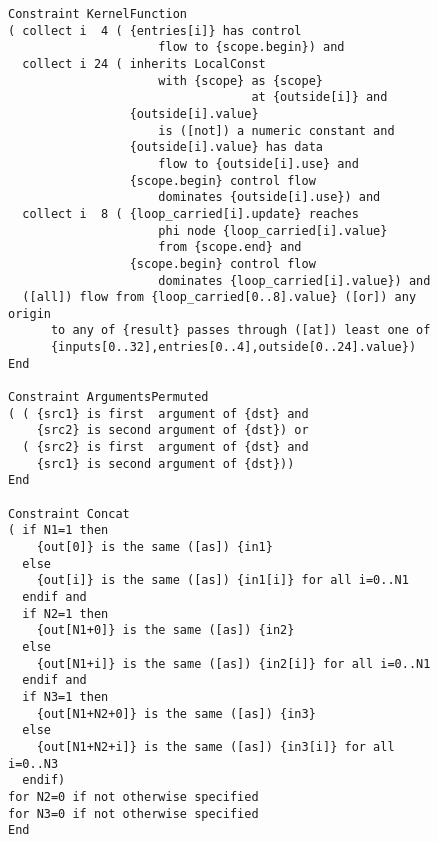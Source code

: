 \begin{figure}[p]
\begin{lstlisting}[language=IDL, firstnumber=189]
Constraint KernelFunction
( collect i  4 ( {entries[i]} has control
                     flow to {scope.begin}) and
  collect i 24 ( inherits LocalConst
                     with {scope} as {scope}
                                  at {outside[i]} and
                 {outside[i].value}
                     is ([not]) a numeric constant and
                 {outside[i].value} has data
                     flow to {outside[i].use} and
                 {scope.begin} control flow
                     dominates {outside[i].use}) and
  collect i  8 ( {loop_carried[i].update} reaches
                     phi node {loop_carried[i].value}
                     from {scope.end} and
                 {scope.begin} control flow
                     dominates {loop_carried[i].value}) and
  ([all]) flow from {loop_carried[0..8].value} ([or]) any origin
      to any of {result} passes through ([at]) least one of
      {inputs[0..32],entries[0..4],outside[0..24].value})
End

Constraint ArgumentsPermuted
( ( {src1} is first  argument of {dst} and
    {src2} is second argument of {dst}) or
  ( {src2} is first  argument of {dst} and
    {src1} is second argument of {dst}))
End

Constraint Concat
( if N1=1 then
    {out[0]} is the same ([as]) {in1}
  else
    {out[i]} is the same ([as]) {in1[i]} for all i=0..N1
  endif and
  if N2=1 then
    {out[N1+0]} is the same ([as]) {in2}
  else
    {out[N1+i]} is the same ([as]) {in2[i]} for all i=0..N1
  endif and
  if N3=1 then
    {out[N1+N2+0]} is the same ([as]) {in3}
  else
    {out[N1+N2+i]} is the same ([as]) {in3[i]} for all i=0..N3
  endif)
for N2=0 if not otherwise specified
for N3=0 if not otherwise specified
End
\end{lstlisting}
\end{figure}